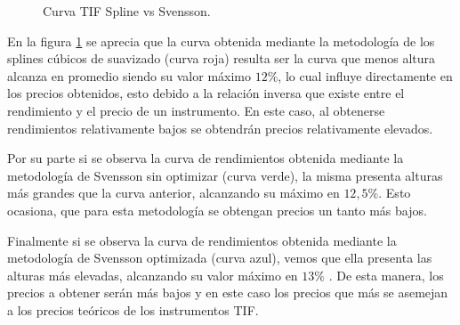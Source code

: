 \newpage

\begin{figure}[h]
\caption{Curva TIF Spline vs Svensson.}
\label{curva_spline_comp_tif}
\end{figure}

\hspace{0.4cm} En la figura \ref{curva_spline_comp_tif} se aprecia que la curva obtenida mediante la metodolog\'ia de los splines c\'ubicos de suavizado (curva roja) resulta ser la curva que menos altura alcanza en promedio siendo su valor m\'aximo $12 \%$, lo cual influye directamente en los precios obtenidos, esto debido a la relaci\'on inversa que existe entre el rendimiento y el precio de un instrumento. En este caso, al obtenerse rendimientos relativamente bajos se obtendr\'an precios relativamente elevados. 

\hspace{0.4cm} Por su parte si se observa la curva de rendimientos obtenida mediante la metodolog\'ia de Svensson sin optimizar (curva verde), la misma presenta alturas m\'as grandes que la curva anterior, alcanzando su m\'aximo en $12,5 \%$. Esto ocasiona, que para esta metodolog\'ia se obtengan precios un tanto m\'as bajos.

\hspace{0.4cm} Finalmente si se observa la curva de rendimientos obtenida mediante la metodolog\'ia de Svensson optimizada (curva azul), vemos que ella presenta las alturas m\'as elevadas, alcanzando su valor m\'aximo en $13 \%$ . De esta manera, los precios a obtener ser\'an m\'as bajos y en este caso los precios que m\'as se asemejan a los precios te\'oricos de los instrumentos TIF.




